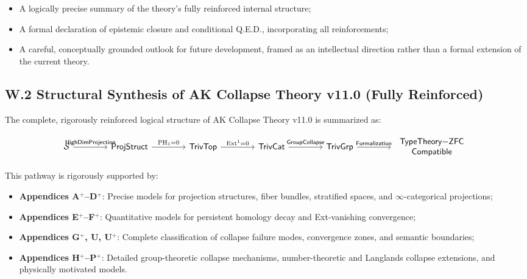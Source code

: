 \documentclass[11pt]{article}
\begin{document}
\begin{itemize}
    \item A logically precise summary of the theory's fully reinforced internal structure;
    \item A formal declaration of epistemic closure and conditional Q.E.D., incorporating all reinforcements;
    \item A careful, conceptually grounded outlook for future development, framed as an intellectual direction rather than a formal extension of the current theory.
\end{itemize}

\subsection*{W.2 Structural Synthesis of AK Collapse Theory v11.0 (Fully Reinforced)}

The complete, rigorously reinforced logical structure of AK Collapse Theory v11.0 is summarized as:

\[
\begin{tikzcd}[column sep=4em, row sep=3em]
\mathcal{S} \arrow[r, "\mathsf{HighDimProjection}"]
& \mathsf{ProjStruct} \arrow[r, "\mathrm{PH}_1 = 0"]
& \mathsf{TrivTop} \arrow[r, "\mathrm{Ext}^1 = 0"]
& \mathsf{TrivCat} \arrow[r, "\mathsf{GroupCollapse}"]
& \mathsf{TrivGrp} \arrow[r, "\mathsf{Formalization}"]
& {\begin{tabular}{c}
\(\mathsf{TypeTheory{-}ZFC}\) \\
\(\mathsf{Compatible}\)
\end{tabular}}
\end{tikzcd}
\]

This pathway is rigorously supported by:

\begin{itemize}
    \item \textbf{Appendices A$^{+}$–D$^{+}$}: Precise models for projection structures, fiber bundles, stratified spaces, and $\infty$-categorical projections;
    \item \textbf{Appendices E$^{+}$–F$^{+}$}: Quantitative models for persistent homology decay and Ext-vanishing convergence;
    \item \textbf{Appendices G$^{+}$, U, U$^{+}$}: Complete classification of collapse failure modes, convergence zones, and semantic boundaries;
    \item \textbf{Appendices H$^{+}$–P$^{+}$}: Detailed group-theoretic collapse mechanisms, number-theoretic and Langlands collapse extensions, and physically motivated models.
\end{itemize}
\end{document}
